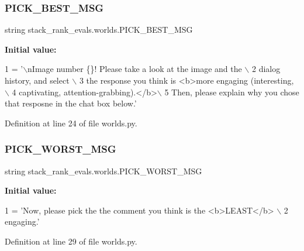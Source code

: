 \subsubsection{\texorpdfstring{P\+I\+C\+K\+\_\+\+B\+E\+S\+T\+\_\+\+M\+SG}{PICK\_BEST\_MSG}}
{\footnotesize\ttfamily string stack\+\_\+rank\+\_\+evals.\+worlds.\+P\+I\+C\+K\+\_\+\+B\+E\+S\+T\+\_\+\+M\+SG}

{\bfseries Initial value\+:}
\begin{DoxyCode}
1 =  \textcolor{stringliteral}{'\(\backslash\)nImage number \{\}! Please take a look at the image and the \(\backslash\)}
2 \textcolor{stringliteral}{                dialog history, and select \(\backslash\)}
3 \textcolor{stringliteral}{                the response you think is <b>more engaging (interesting, \(\backslash\)}
4 \textcolor{stringliteral}{                captivating, attention-grabbing).</b>\(\backslash\)}
5 \textcolor{stringliteral}{                Then, please explain why you chose that resposne in the chat box below.'}
\end{DoxyCode}


Definition at line 24 of file worlds.\+py.

\mbox{\label{namespacestack__rank__evals_1_1worlds_a968f31845a86d59d1fe2e14e8a5d636f}} 
\subsubsection{\texorpdfstring{P\+I\+C\+K\+\_\+\+W\+O\+R\+S\+T\+\_\+\+M\+SG}{PICK\_WORST\_MSG}}
{\footnotesize\ttfamily string stack\+\_\+rank\+\_\+evals.\+worlds.\+P\+I\+C\+K\+\_\+\+W\+O\+R\+S\+T\+\_\+\+M\+SG}

{\bfseries Initial value\+:}
\begin{DoxyCode}
1 =  \textcolor{stringliteral}{'Now, please pick the the comment you think is the <b>LEAST</b> \(\backslash\)}
2 \textcolor{stringliteral}{                  engaging.'}
\end{DoxyCode}


Definition at line 29 of file worlds.\+py.

\mbox{\label{namespacestack__rank__evals_1_1worlds_a7871caf8745dbbcc6f50fcf1777c7225}} 
